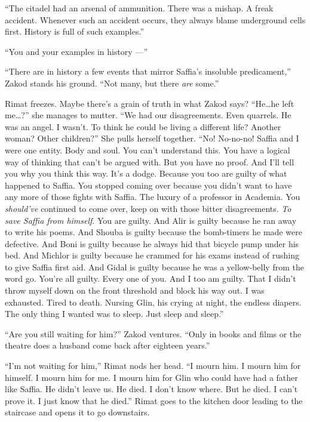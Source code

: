 \documentclass[twoside,11pt,openany]{book}
\begin{document}
``The citadel had an arsenal of ammunition. There was a mishap. A freak accident. Whenever such an accident
occurs, they always blame underground cells first. History is full of such examples.''

``You and your examples in history ---''

``There are in history a few events that mirror Saffia's insoluble predicament,'' Zakod stands
his ground. ``Not many, but there \textit{are} some.''

Rimat freezes. Maybe there's a grain of truth in what Zakod says?
``He{\ldots}he left me{\ldots}?'' she
manages to mutter. ``We had our disagreements. Even quarrels. He was an angel. I wasn't. To think he could be living a
different life? Another woman? Other children?'' She pulls herself together. ``No! No-no-no!
Saffia and I were one entity. Body and soul.  You can't understand this. You have a logical way of thinking that can't
be argued with. But you have no proof. And I'll tell you why you think this way. It's a dodge. Because you too are
guilty of what happened to Saffia. You stopped coming over because you didn't want to have any more of those fights
with Saffia. The luxury of a professor in Academia. You \textit{should've} continued to come over, keep on with those
bitter disagreements. \textit{To save Saffia from himself}. You are guilty. And Alir is guilty because he ran away to
write his poems. And Shouba is guilty because the bomb-timers he made were defective. And Boni is guilty because he
always hid that bicycle pump under his bed. And Michlor is guilty because he crammed for his exams instead of rushing
to give Saffia first aid. And Gidal is guilty because he was a yellow-belly from the word go.  You're all guilty.
Every one of you. And I too am guilty. That I didn't throw myself down on the front threshold and block his way out. I
was exhausted. Tired to death. Nursing Glin, his crying at night, the endless diapers. The only thing I wanted was to
sleep. Just sleep and sleep.''

``Are you still waiting for him?'' Zakod ventures. ``Only in books and films or
the theatre does a husband come back after eighteen years.''

``I'm not waiting for him,'' Rimat nods her head. ``I mourn him. I mourn him for
himself. I mourn him for me. I mourn him for Glin who could have had a father like Saffia. He didn't leave us. He died.
I don't know where. But he died. I can't prove it. I just know that he died.'' Rimat goes to the kitchen
door leading to the staircase and opens it to go downstairs.
\end{document}
